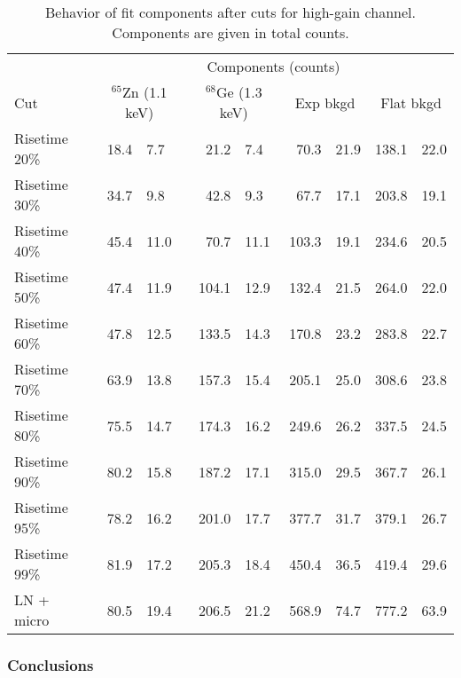 						\begin{sidewaystable}
							\centering
							\begin{tabular}{l  r@{$~\pm~$}l  r@{$~\pm~$}l  r@{$~\pm~$}l  r@{$~\pm~$}l  }
								\toprule 
								& \multicolumn{8}{c}{Components (counts)} \\
								\cmidrule[1pt]{2-8} 
								Cut & \multicolumn{2}{c}{$^{65}$Zn (1.1 keV)} & \multicolumn{2}{c}{$^{68}$Ge (1.3 keV)} & \multicolumn{2}{c}{Exp bkgd} & \multicolumn{2}{c}{Flat bkgd}  \\
								\midrule
							        	 Risetime 20\% & 18.4 & 7.7 & 21.2 & 7.4 & 70.3 & 21.9 & 138.1 & 22.0  \\
									 Risetime 30\% & 34.7 & 9.8 & 42.8 & 9.3 & 67.7 & 17.1 & 203.8 & 19.1  \\
									 Risetime 40\% & 45.4 & 11.0 & 70.7 & 11.1 & 103.3 & 19.1 & 234.6 & 20.5  \\
									 Risetime 50\% & 47.4 & 11.9 & 104.1 & 12.9 & 132.4 & 21.5 & 264.0 & 22.0  \\
									 Risetime 60\% & 47.8 & 12.5 & 133.5 & 14.3 & 170.8 & 23.2 & 283.8 & 22.7  \\
									 Risetime 70\% & 63.9 & 13.8 & 157.3 & 15.4 & 205.1 & 25.0 & 308.6 & 23.8  \\
									 Risetime 80\% & 75.5 & 14.7 & 174.3 & 16.2 & 249.6 & 26.2 & 337.5 & 24.5  \\
									 Risetime 90\% & 80.2 & 15.8 & 187.2 & 17.1 & 315.0 & 29.5 & 367.7 & 26.1  \\
									 Risetime 95\% & 78.2 & 16.2 & 201.0 & 17.7 & 377.7 & 31.7 & 379.1 & 26.7  \\
									 Risetime 99\% & 81.9 & 17.2 & 205.3 & 18.4 & 450.4 & 36.5 & 419.4 & 29.6  \\
									 LN + micro & 80.5 & 19.4 & 206.5 & 21.2 & 568.9 & 74.7 & 777.2 & 63.9  \\
								 
								\bottomrule
							\end{tabular}

							\caption[Behavior of fit components after cuts for high-gain BeGe channel]
							{Behavior of fit components after cuts for high-gain channel.  Components are given in total counts.}
							\label{tab:RTHighGainResults}
						\end{sidewaystable}

		\subsubsection{Conclusions}
		\label{sec:RTBeGeConclusions}
		
